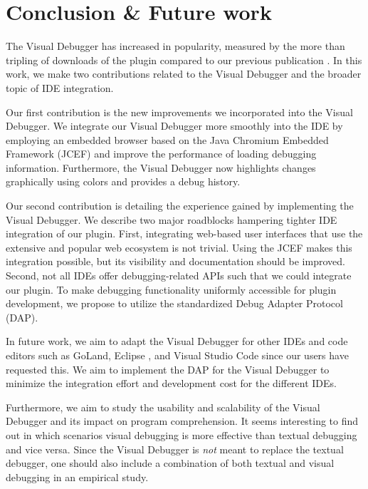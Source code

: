 \documentclass[sigconf]{acmart}
\begin{document}
\section{Conclusion \& Future work} \label{sec:conclusion}
The Visual Debugger has increased in popularity, measured by the more than tripling of downloads of the plugin compared to our previous publication \cite{krauterVisualDebuggerTool2022}.
In this work, we make two contributions related to the Visual Debugger and the broader topic of IDE integration.

Our first contribution is the new improvements we incorporated into the Visual Debugger.
We integrate our Visual Debugger more smoothly into the IDE by employing an embedded browser based on the Java Chromium Embedded Framework (JCEF) and improve the performance of loading debugging information.
Furthermore, the Visual Debugger now highlights changes graphically using colors and provides a debug history.

Our second contribution is detailing the experience gained by implementing the Visual Debugger.
We describe two major roadblocks hampering tighter IDE integration of our plugin.
First, integrating web-based user interfaces that use the extensive and popular web ecosystem is not trivial.
Using the JCEF makes this integration possible, but its visibility and documentation should be improved.
Second, not all IDEs offer debugging-related APIs such that we could integrate our plugin.
To make debugging functionality uniformly accessible for plugin development, we propose to utilize the standardized Debug Adapter Protocol (DAP).

In future work, we aim to adapt the Visual Debugger for other IDEs and code editors such as GoLand, Eclipse \cite{desrivieresEclipsePlatformIntegrating2004}, and Visual Studio Code since our users have requested this.
We aim to implement the DAP for the Visual Debugger to minimize the integration effort and development cost for the different IDEs.

Furthermore, we aim to study the usability and scalability of the Visual Debugger and its impact on program comprehension.
It seems interesting to find out in which scenarios visual debugging is more effective than textual debugging and vice versa.
Since the Visual Debugger is \textit{not} meant to replace the textual debugger, one should also include a combination of both textual and visual debugging in an empirical study.


\renewcommand\UrlFont{\color{black}}



\end{document}
